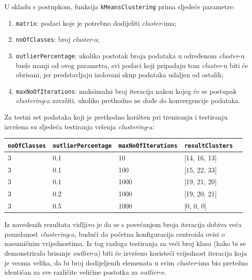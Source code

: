 \documentclass[12pt,a4paper]{article}
\begin{document}
U skladu s postupkom, funkcija \texttt{kMeansClustering} prima sljedeće parametre:

\begin{enumerate}

\item \texttt{matrix}: podaci koje je potrebno dodijeliti \textit{cluster}-ima;
\item \texttt{noOfClasses}: broj \textit{cluster}-a;
\item \texttt{outlierPercentage}: ukoliko postotak broja podataka u određenom \textit{cluster}-u bude manji od ovog parametra, svi podaci koji pripadaju tom \textit{cluster}-u biti će obrisani, jer predstavljaju izolovani skup podataka udaljen od ostalih;
\item \texttt{maxNoOfIterations}: maksimalni broj iteracija nakon kojeg će se postupak \textit{clustering}-a završiti, ukoliko prethodno ne dođe do konvergencije podataka. 

\end{enumerate}

Za testni set podataka koji je prethodno korišten pri treniranju i testiranju izvršena su sljedeća testiranja vršenja \textit{clustering}-a:

\begin{table}[H]
\centering
\begin{tabular}{|l|l|l|l|l|}
\hline
\textbf{\texttt{noOfClasses}} 		& \textbf{\texttt{outlierPercentage}}   	& \textbf{ \texttt{maxNoOfIterations}} 		& \textbf{\texttt{resultClusters}} 			\\ \hline
3            						& 0.1 								& 10              							& [14, 16, 13]            				   	\\ \hline
3            						& 0.1 								& 100              							& [15, 22, 33]          				   		\\ \hline
3            						& 0.1 								& 1000              							& [19, 21, 20]          				   		\\ \hline
3           						& 0.2 								& 1000             							& [19, 20, 21]          					 	\\ \hline
3           						& 0.5 								& 1000             							& [0, 0, 0]              					 	\\ \hline
\end{tabular}
\end{table}

\newpage

Iz navedenih rezultata vidljivo je da se s povećanjem broja iteracija dobiva veća pouzdanost \textit{clustering}-a, budući da početna konfiguracija centroida ovisi o nasumičnim vrijednostima. Iz tog razloga testiranja za veći broj klasa (kako bi se demonstriralo brisanje \textit{outlier}-a) biti će izvršeno koristeći vrijednost iteracija koja je veoma velika, da bi broj dodijeljenih elemenata u svim \textit{cluster}-ima bio pretežno identičan za sve različite veličine postotka za \textit{outlier}-e.
\end{document}
